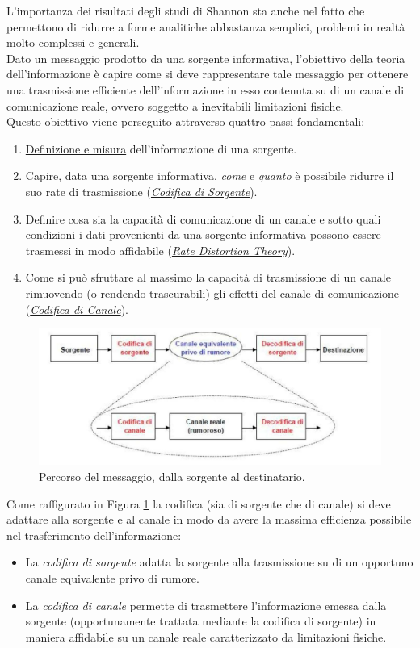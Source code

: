 L’importanza dei risultati degli studi di Shannon sta anche nel fatto che permettono di ridurre a forme
analitiche abbastanza semplici, problemi in realtà molto complessi e generali. \\
Dato un messaggio prodotto da una sorgente informativa, l’obiettivo della teoria dell’informazione è capire
come si deve rappresentare tale messaggio per ottenere una trasmissione efficiente dell’informazione in esso
contenuta su di un canale di comunicazione reale, ovvero soggetto a inevitabili limitazioni fisiche. \\
Questo obiettivo viene perseguito attraverso quattro passi fondamentali:
\begin{enumerate}
    \item \hyperref[sec:def]{Definizione e misura} dell’informazione di una sorgente.
    \item Capire, data una sorgente informativa, \textit{come} e \textit{quanto} è possibile ridurre il suo rate di trasmissione (\hyperref[sec:sorg]{\textit{Codifica di Sorgente}}).
    \item Definire cosa sia la capacità di comunicazione di un canale e sotto quali condizioni i dati provenienti da una sorgente informativa possono essere trasmessi in modo affidabile (\hyperref[sec:rdt]{\textit{Rate Distortion Theory}}).
    \item Come si può sfruttare al massimo la capacità di trasmissione di un canale rimuovendo (o rendendo trascurabili) gli effetti del canale di comunicazione (\hyperref[sec:can]{\textit{Codifica di Canale}}).
\end{enumerate}
\begin{figure}[H]
    \centering
    \includegraphics[scale=0.2]{img/croppedim.jpg}
    \caption{Percorso del messaggio, dalla sorgente al destinatario.}
    \label{fig:percorso}
\end{figure}
Come raffigurato in Figura \ref{fig:percorso} la codifica (sia di sorgente che di canale) si deve adattare alla sorgente e al canale in modo da avere la massima efficienza possibile nel trasferimento dell'informazione:
\begin{itemize}
    \item La \textit{codifica di sorgente} adatta la sorgente alla trasmissione su di un opportuno canale equivalente privo di rumore.
    \item La \textit{codifica di canale} permette di trasmettere l’informazione emessa dalla sorgente (opportunamente
trattata mediante la codifica di sorgente) in maniera affidabile su un canale reale caratterizzato da limitazioni fisiche.
\end{itemize}

